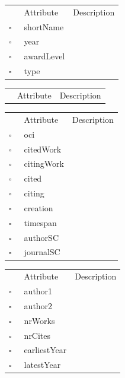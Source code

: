 \begin{table}
\caption{Award  }

\begin{longtable}{llp{8cm}}
& Attribute & Description \\
$\square$\ & shortName &  \\
$\square$\ & year &  \\
$\square$\ & awardLevel &  \\
$\square$\ & type &  \\
\end{longtable}
\label{attr:Award}
\end{table}

\begin{table}
\caption{Book  }

\begin{longtable}{llp{8cm}}
& Attribute & Description \\
\end{longtable}
\label{attr:Book}
\end{table}

\begin{table}
\caption{Citation  }

\begin{longtable}{llp{8cm}}
& Attribute & Description \\
$\square$\ & oci &  \\
$\square$\ & citedWork &  \\
$\square$\ & citingWork &  \\
$\square$\ & cited &  \\
$\square$\ & citing &  \\
$\square$\ & creation &  \\
$\square$\ & timespan &  \\
$\square$\ & authorSC &  \\
$\square$\ & journalSC &  \\
\end{longtable}
\label{attr:Citation}
\end{table}

\begin{table}
\caption{Coauthor  }

\begin{longtable}{llp{8cm}}
& Attribute & Description \\
$\square$\ & author1 &  \\
$\square$\ & author2 &  \\
$\square$\ & nrWorks &  \\
$\square$\ & nrCites &  \\
$\square$\ & earliestYear &  \\
$\square$\ & latestYear &  \\
\end{longtable}
\label{attr:Coauthor}
\end{table}

